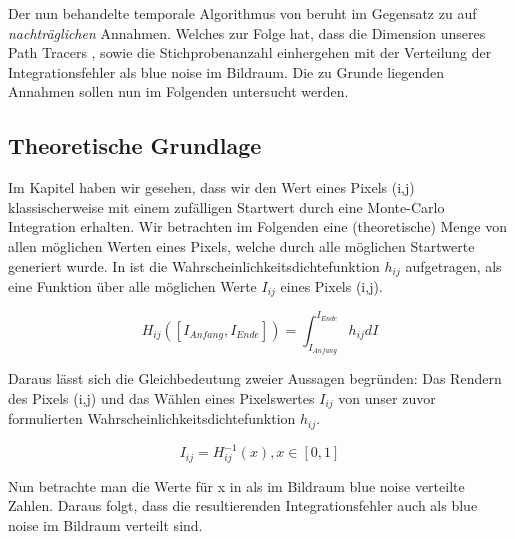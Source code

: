 Der nun behandelte temporale Algorithmus von \cite{hal02158423} beruht 
im Gegensatz zu \cite{georgiev2016blue} auf \textit{nachträglichen} 
Annahmen. Welches zur Folge hat, dass die Dimension unseres Path Tracers
, sowie die Stichprobenanzahl einhergehen 
mit der Verteilung der Integrationsfehler als blue noise im Bildraum.
Die zu Grunde liegenden Annahmen sollen nun im Folgenden untersucht werden.

\subsection{Theoretische Grundlage}
Im Kapitel  haben wir gesehen, dass 
wir den Wert eines Pixels (i,j) klassischerweise mit einem zufälligen
Startwert durch eine Monte-Carlo Integration erhalten. Wir betrachten im
Folgenden eine (theoretische) Menge von allen möglichen Werten eines 
Pixels, welche durch alle möglichen Startwerte generiert wurde.
In  ist die Wahrscheinlichkeitsdichtefunktion
$h_{ij}$ aufgetragen, als eine Funktion über alle möglichen Werte 
$I_{ij}$ eines Pixels (i,j).

\begin{equation}\label{eq:Pixel Schätzung Wahrscheinlichkeitsdichtefunktion}
    H_{ij}([I_{Anfang},I_{Ende}]) = \int_{I_{Anfang}}^{I_{Ende}} h_{ij} dI
\end{equation}

Daraus lässt sich die Gleichbedeutung zweier Aussagen begründen:
Das Rendern des Pixels (i,j) und das Wählen eines Pixelswertes $I_{ij}$
von unser zuvor formulierten Wahrscheinlichkeitsdichtefunktion $h_{ij}$.

\begin{equation}\label{eq:inverse Funktion}
    I_{ij} = H_{ij}^{-1}(x), x \in [0,1]
\end{equation}

Nun betrachte man die Werte für x in  als im Bildraum
blue noise verteilte Zahlen. Daraus folgt, dass die resultierenden
Integrationsfehler auch als blue noise im Bildraum verteilt sind.


